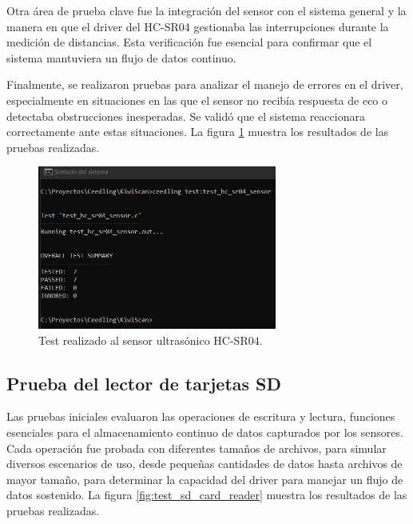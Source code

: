 Otra área de prueba clave fue la integración del sensor con el sistema general y la manera en que el driver del HC-SR04 gestionaba las interrupciones durante la medición de distancias. Esta verificación fue esencial para confirmar que el sistema mantuviera un flujo de datos continuo.

Finalmente, se realizaron pruebas para analizar el manejo de errores en el driver, especialmente en situaciones en las que el sensor no recibía respuesta de eco o detectaba obstrucciones inesperadas. Se validó que el sistema reaccionara correctamente ante estas situaciones. La figura \ref{fig:test_hc_sr04_sensor} muestra los resultados de las pruebas realizadas.

\vspace{1cm}

\begin{figure}[htbp]
	\centering
	\includegraphics[width=0.7\textwidth, height=0.3\textheight]{./Figures/test_hc_sr04_sensor.png}
	\caption{Test realizado al sensor ultrasónico HC-SR04.}
	\label{fig:test_hc_sr04_sensor}
\end{figure}

\vspace{1cm}

\subsection{Prueba del lector de tarjetas SD}

Las pruebas iniciales evaluaron las operaciones de escritura y lectura, funciones esenciales para el almacenamiento continuo de datos capturados por los sensores. Cada operación fue probada con diferentes tamaños de archivos, para simular diversos escenarios de uso, desde pequeñas cantidades de datos hasta archivos de mayor tamaño, para determinar la capacidad del driver para manejar un flujo de datos sostenido. La figura \ref{fig:test_sd_card_reader} muestra los resultados de las pruebas realizadas.

